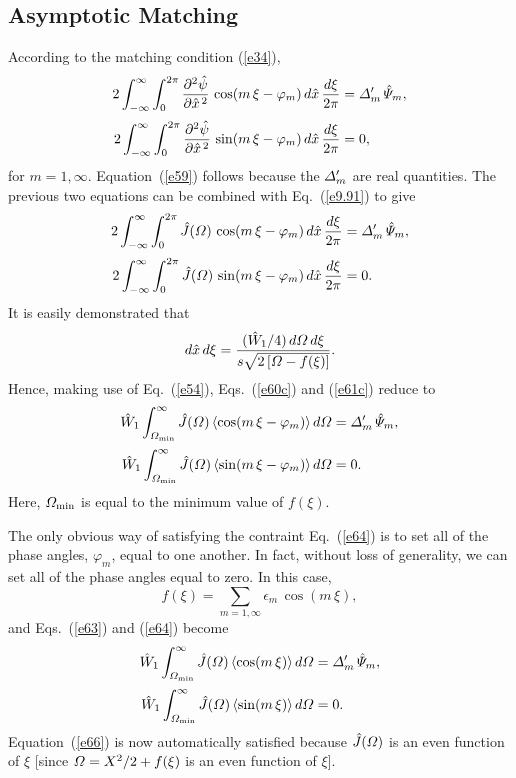 \documentclass[12pt,prb,aps]{revtex4-1}
\begin{document}
\subsection{Asymptotic Matching} 
According to the matching condition (\ref{e34}),
\begin{align}
2\int_{-\infty}^\infty \int_0^{2\pi} \frac{\partial^2\hat{\psi}}{\partial \hat{x}^{\,2}}\,\cos(m\,\xi-\varphi_m)\,d\hat{x}\,\frac{d\xi}{2\pi}& = {\mit\Delta}_m'\,\hat{\mit\Psi}_m,\\[0.5ex]
2\int_{-\infty}^\infty \int_0^{2\pi} \frac{\partial^2\hat{\psi}}{\partial \hat{x}^{\,2}}\,\sin(m\,\xi-\varphi_m)\,d\hat{x}\,\frac{d\xi}{2\pi}& =0,\label{e59}
\end{align}
for $m=1,\infty$. Equation~(\ref{e59}) follows because the ${\mit\Delta}_m'$ are real quantities. 
The previous two equations can be combined with Eq.~(\ref{e9.91}) to give 
\begin{align}\label{e60c}
2\int_{-\infty}^\infty \int_0^{2\pi} \hat{J}({\mit\Omega})\,\cos(m\,\xi-\varphi_m)\,d\hat{x}\,\frac{d\xi}{2\pi}& = {\mit\Delta}_m'\,\hat{\mit\Psi}_m,\\[0.5ex]
2\int_{-\infty}^\infty \int_0^{2\pi} \hat{J}({\mit\Omega})\,\sin(m\,\xi-\varphi_m)\,d\hat{x}\,\frac{d\xi}{2\pi}& =0.\label{e61c}
\end{align}
 It is easily demonstrated that 
\begin{equation}
d\hat{x}\,d\xi = \frac{(\hat{W}_1/4)\,d{\mit\Omega}\,d\xi}{s\sqrt{2\left[{\mit\Omega}-f(\xi)\right]}}.
\end{equation}
Hence, making use of  Eq.~(\ref{e54}), Eqs.~(\ref{e60c}) and (\ref{e61c}) reduce to 
\begin{align}\label{e63}
\hat{W}_1\int_{{\mit\Omega}_{\rm min}}^\infty\hat{J}({\mit\Omega})\,\langle\cos(m\,\xi-\varphi_m)\rangle\,d{\mit\Omega}&= {\mit\Delta}_m'\,\hat{\mit\Psi}_m,\\[0.5ex]
\hat{W}_1\int_{{\mit\Omega}_{\rm min}}^\infty\hat{J}({\mit\Omega})\,\langle\sin(m\,\xi-\varphi_m)\rangle\,d{\mit\Omega}&=0.\label{e64}
\end{align}
Here, ${\mit\Omega}_{\rm min}$ is equal to the minimum value of $f(\xi)$. 

The only obvious way of satisfying the contraint Eq.~(\ref{e64}) is to set all of the phase angles, $\varphi_m$, equal to
one another. In fact, without loss of generality, we can set all of the phase angles equal to zero. In this case,
\begin{equation}\label{e65}
f(\xi) = \sum_{m=1,\infty} \epsilon_m\,\cos(m\,\xi),
\end{equation}
and Eqs.~(\ref{e63}) and (\ref{e64}) become 
\begin{align}\label{e65a}
\hat{W}_1\int_{{\mit\Omega}_{\rm min}}^\infty\hat{J}({\mit\Omega})\,\langle\cos(m\,\xi)\rangle\,d{\mit\Omega}&= {\mit\Delta}_m'\,\hat{\mit\Psi}_m,\\[0.5ex]
\hat{W}_1\int_{{\mit\Omega}_{\rm min}}^\infty\hat{J}({\mit\Omega})\,\langle\sin(m\,\xi)\rangle\,d{\mit\Omega}&=0.\label{e66}
\end{align}
Equation~(\ref{e66}) is now automatically satisfied because $\hat{J}({\mit\Omega})$ is an even function of $\xi$ [since ${\mit\Omega}= X^2/2+f(\xi)$ is an even function of $\xi$]. 
\end{document}
